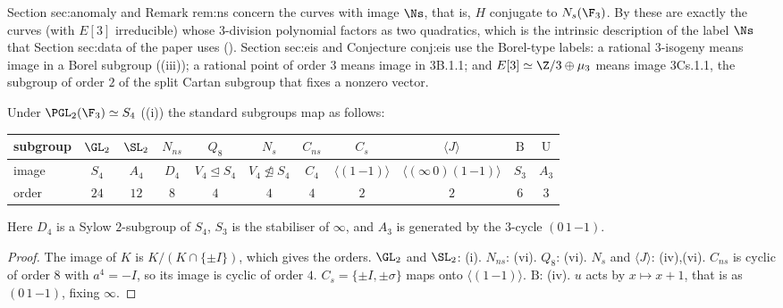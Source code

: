 \begin{paperlink}
Section sec:anomaly and Remark rem:ns concern the curves with image $\Ns$, that is, $H$ conjugate to $N_s(\F_3)$. By  these are exactly
the curves (with $E[3]$ irreducible) whose $3$-division polynomial factors as two quadratics, which is the intrinsic description of the label $\Ns$ that Section sec:data of the paper uses
(). Section sec:eis and Conjecture conj:eis use the Borel-type labels: a rational $3$-isogeny means image in a Borel subgroup
((iii)); a rational point of order $3$ means image in 3B.1.1; and $E[3]\simeq\Z/3\oplus\mu_3$ means image 3Cs.1.1, the subgroup of order $2$ of the split
Cartan subgroup that fixes a nonzero vector.
\end{paperlink}

\begin{proposition}[Images in $S_4$]\label{prop:groups:imagesS4}
Under $\PGL_2(\F_3)\simeq S_4$ ((i)) the standard subgroups map as follows:
\begin{center}
\small
\begin{tabular}{lcccccccccc}
\toprule
subgroup & $\GL_2$ & $\SL_2$ & $N_{ns}$ & $Q_8$ & $N_s$ & $C_{ns}$ & $C_s$ & $\langle J\rangle$ & $\mathrm B$ & $\mathrm U$\\
\midrule
image & $S_4$ & $A_4$ & $D_4$ & $V_4\trianglelefteq S_4$ & $V_4\not\trianglelefteq S_4$ & $C_4$ & $\langle(1\,{-1})\rangle$ & $\langle(\infty\,0)(1\,{-1})\rangle$ & $S_3$ & $A_3$\\
order & $24$ & $12$ & $8$ & $4$ & $4$ & $4$ & $2$ & $2$ & $6$ & $3$\\
\bottomrule
\end{tabular}
\end{center}
Here $D_4$ is a Sylow $2$-subgroup of $S_4$, $S_3$ is the stabiliser of $\infty$, and $A_3$ is generated by the $3$-cycle $(0\,1\,{-1})$.
\end{proposition}

\begin{proof}
The image of $K$ is $K/(K\cap\{\pm I\})$, which gives the orders. $\GL_2$ and $\SL_2$: (i). $N_{ns}$: (vi). $Q_8$:
(vi). $N_s$ and $\langle J\rangle$: (iv),(vi). $C_{ns}$ is cyclic of order $8$ with $a^4=-I$, so its image is cyclic of order $4$. $C_s=\{\pm I,\pm\sigma\}$
maps onto $\langle(1\,{-1})\rangle$. $\mathrm B$: (iv). $u$ acts by $x\mapsto x+1$, that is as $(0\,1\,{-1})$, fixing $\infty$.
\end{proof}

